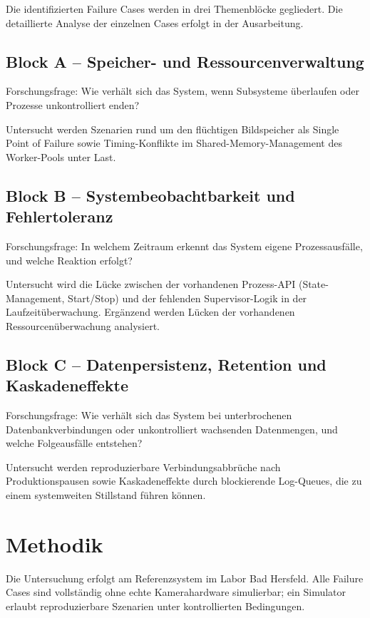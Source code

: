 Die identifizierten Failure Cases werden in drei Themenblöcke gegliedert. Die detaillierte
Analyse der einzelnen Cases erfolgt in der Ausarbeitung.

\subsection{Block A -- Speicher- und Ressourcenverwaltung}

Forschungsfrage: Wie verhält sich das System, wenn Subsysteme überlaufen oder Prozesse unkontrolliert enden?

Untersucht werden Szenarien rund um den flüchtigen Bildspeicher als Single Point of
Failure sowie Timing-Konflikte im Shared-Memory-Management des Worker-Pools unter Last.

\subsection{Block B -- Systembeobachtbarkeit und Fehlertoleranz}

Forschungsfrage: In welchem Zeitraum erkennt das System eigene Prozessausfälle, und
welche Reaktion erfolgt?

Untersucht wird die Lücke zwischen der vorhandenen Prozess-API (State-Management,
Start/Stop) und der fehlenden Supervisor-Logik in der Laufzeitüberwachung. Ergänzend
werden Lücken der vorhandenen Ressourcenüberwachung analysiert.

\subsection{Block C -- Datenpersistenz, Retention und Kaskadeneffekte}

Forschungsfrage: Wie verhält sich das System bei unterbrochenen Datenbankverbindungen
oder unkontrolliert wachsenden Datenmengen, und welche Folgeausfälle entstehen?

Untersucht werden reproduzierbare Verbindungsabbrüche nach Produktionspausen sowie
Kaskadeneffekte durch blockierende Log-Queues, die zu einem systemweiten Stillstand
führen können.

\section{Methodik}

Die Untersuchung erfolgt am Referenzsystem im Labor Bad Hersfeld. Alle Failure Cases sind
vollständig ohne echte Kamerahardware simulierbar; ein Simulator erlaubt reproduzierbare
Szenarien unter kontrollierten Bedingungen.

